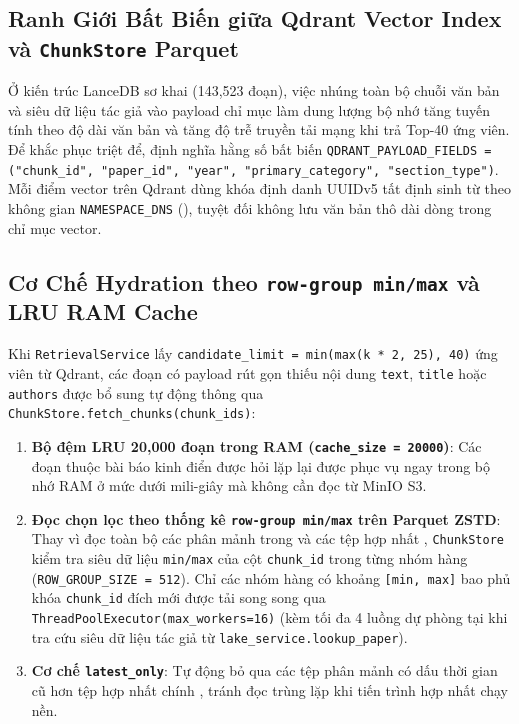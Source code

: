 \subsection{\texorpdfstring{Ranh Giới Bất Biến giữa Qdrant Vector Index và \texttt{ChunkStore} Parquet}{Ranh Gioi Bat Bien giua Qdrant Vector Index va ChunkStore Parquet}}
\label{sec:ch4_qdrant_boundary}

Ở kiến trúc LanceDB sơ khai (143,523 đoạn), việc nhúng toàn bộ chuỗi văn bản và siêu dữ liệu tác giả vào payload chỉ mục làm dung lượng bộ nhớ tăng tuyến tính theo độ dài văn bản và tăng độ trễ truyền tải mạng khi trả Top-40 ứng viên. Để khắc phục triệt để,  định nghĩa hằng số bất biến \texttt{QDRANT\_PAYLOAD\_FIELDS = ("chunk\_id", "paper\_id", "year", "primary\_category", "section\_type")}. Mỗi điểm vector trên Qdrant dùng khóa định danh UUIDv5 tất định sinh từ  theo không gian \texttt{NAMESPACE\_DNS} (), tuyệt đối không lưu văn bản thô dài dòng trong chỉ mục vector.

\subsection{\texorpdfstring{Cơ Chế Hydration theo \texttt{row-group min/max} và LRU RAM Cache}{Co Che Hydration theo row-group min/max va LRU RAM Cache}}
\label{sec:ch4_hydration}

Khi \texttt{RetrievalService} lấy \texttt{candidate\_limit = min(max(k * 2, 25), 40)} ứng viên từ Qdrant, các đoạn có payload rút gọn thiếu nội dung \texttt{text}, \texttt{title} hoặc \texttt{authors} được bổ sung tự động thông qua \texttt{ChunkStore.fetch\_chunks(chunk\_ids)}:
\begin{enumerate}[label=\textbf{\arabic*.}]
  \item \textbf{Bộ đệm LRU 20,000 đoạn trong RAM (\texttt{cache\_size = 20000})}: Các đoạn thuộc bài báo kinh điển được hỏi lặp lại được phục vụ ngay trong bộ nhớ RAM ở mức dưới mili-giây mà không cần đọc từ MinIO S3.
  \item \textbf{Đọc chọn lọc theo thống kê \texttt{row-group min/max} trên Parquet ZSTD}: Thay vì đọc toàn bộ các phân mảnh trong  và các tệp hợp nhất , \texttt{ChunkStore} kiểm tra siêu dữ liệu \texttt{min/max} của cột \texttt{chunk\_id} trong từng nhóm hàng (\texttt{ROW\_GROUP\_SIZE = 512}). Chỉ các nhóm hàng có khoảng \texttt{[min, max]} bao phủ khóa \texttt{chunk\_id} đích mới được tải song song qua \texttt{ThreadPoolExecutor(max\_workers=16)} (kèm tối đa 4 luồng dự phòng tại  khi tra cứu siêu dữ liệu tác giả từ \texttt{lake\_service.lookup\_paper}).
  \item \textbf{Cơ chế \texttt{latest\_only}}: Tự động bỏ qua các tệp phân mảnh  có dấu thời gian cũ hơn tệp hợp nhất chính , tránh đọc trùng lặp khi tiến trình hợp nhất chạy nền.
\end{enumerate}

